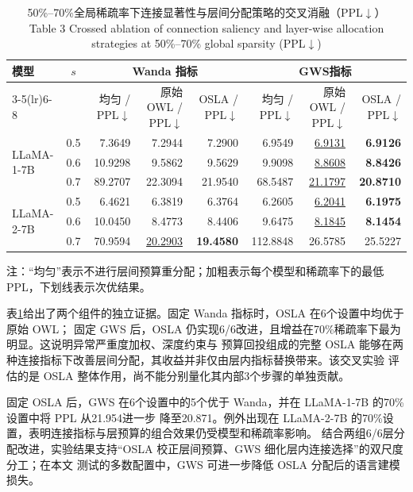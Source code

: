 \documentclass[UTF8,fontset=fandol]{ctexart}
\renewcommand{\arraystretch}{1.08}
\newcommand{\gws}{\textsc{GWS}}
\newcommand{\best}[1]{\textbf{#1}}
\newcommand{\second}[1]{\underline{#1}}
\begin{document}
\begin{table}[!htbp]
\centering
\caption{50\%--70\%全局稀疏率下连接显著性与层间分配策略的交叉消融（PPL$\downarrow$）\\
Table 3 Crossed ablation of connection saliency and layer-wise allocation strategies at 50\%--70\% global sparsity (PPL$\downarrow$)}
\label{tab:ablation}
\scriptsize
\setlength{\tabcolsep}{4.2pt}
\renewcommand{\arraystretch}{0.98}
\begin{tabular*}{0.92\textwidth}{@{\extracolsep{\fill}}lcrrrrrr@{}}
\toprule
\multirow{2}{*}{模型} & \multirow{2}{*}{$s$} &
\multicolumn{3}{c}{Wanda 指标} & \multicolumn{3}{c}{\gws 指标} \\
\cmidrule(lr){3-5}\cmidrule(lr){6-8}
 & & 均匀 / PPL$\downarrow$ & 原始 OWL / PPL$\downarrow$ & OSLA / PPL$\downarrow$ & 均匀 / PPL$\downarrow$ & 原始 OWL / PPL$\downarrow$ & OSLA / PPL$\downarrow$ \\
\midrule
\multirow{3}{*}{LLaMA-1-7B}
 & 0.5 & 7.3649 & 7.2944 & 7.2900 & 6.9549 & \second{6.9131} & \best{6.9126} \\
 & 0.6 & 10.9298 & 9.5862 & 9.5629 & 9.9098 & \second{8.8608} & \best{8.8426} \\
 & 0.7 & 89.2707 & 22.3094 & 21.9540 & 68.5487 & \second{21.1797} & \best{20.8710} \\
\midrule
\multirow{3}{*}{LLaMA-2-7B}
 & 0.5 & 6.4621 & 6.3819 & 6.3764 & 6.2605 & \second{6.2041} & \best{6.1975} \\
 & 0.6 & 10.0450 & 8.4773 & 8.4406 & 9.6475 & \second{8.1845} & \best{8.1454} \\
 & 0.7 & 70.9594 & \second{20.2903} & \best{19.4580} & 112.8848 & 26.5785 & 25.5227 \\
\bottomrule
\end{tabular*}
\vspace{2pt}
\parbox{0.92\textwidth}{\scriptsize
注：“均匀”表示不进行层间预算重分配；加粗表示每个模型和稀疏率下的最低 PPL，下划线表示次优结果。}
\end{table}

表\ref{tab:ablation}给出了两个组件的独立证据。固定 Wanda 指标时，OSLA 在6个设置中均优于原始 OWL；
固定 GWS 后，OSLA 仍实现6/6改进，且增益在70\%稀疏率下最为明显。这说明异常严重度加权、深度约束与
预算回投组成的完整 OSLA 能够在两种连接指标下改善层间分配，其收益并非仅由层内指标替换带来。该交叉实验
评估的是 OSLA 整体作用，尚不能分别量化其内部3个步骤的单独贡献。

固定 OSLA 后，GWS 在6个设置中的5个优于 Wanda，并在 LLaMA-1-7B 的70\%设置中将 PPL 从21.954进一步
降至20.871。例外出现在 LLaMA-2-7B 的70\%设置，表明连接指标与层预算的组合效果仍受模型和稀疏率影响。
结合两组6/6层分配改进，实验结果支持“OSLA 校正层间预算、GWS 细化层内连接选择”的双尺度分工；在本文
测试的多数配置中，GWS 可进一步降低 OSLA 分配后的语言建模损失。
\end{document}
